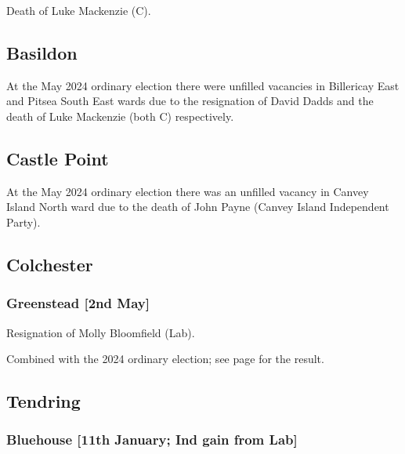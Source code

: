 \documentclass[a4paper,openany]{book}
\begin{document}
\begin{resultsiii}

Death of Luke Mackenzie (C).

\subsection*{Basildon}

At the May 2024 ordinary election there were unfilled vacancies in Billericay East and Pitsea South East wards due to the resignation of David Dadds and the death of Luke Mackenzie (both C) respectively.%

\subsection*{Castle Point}

At the May 2024 ordinary election there was an unfilled vacancy in Canvey Island North ward due to the death of John Payne (Canvey Island Independent Party).%

\subsection*{Colchester}

\subsubsection*{Greenstead \hspace*{\fill}\nolinebreak[1]%
	\enspace\hspace*{\fill}
	[2nd May]}


Resignation of Molly Bloomfield (Lab).

Combined with the 2024 ordinary election; see page \pageref{ColchesterGreenstead} for the result.

\subsection*{Tendring}

\subsubsection*{Bluehouse \hspace*{\fill}\nolinebreak[1]%
	\enspace\hspace*{\fill}
	[11th January; Ind gain from Lab]}


\end{resultsiii}
\end{document}

